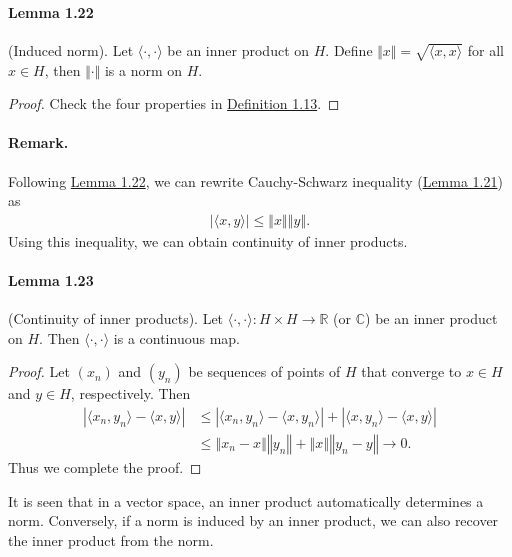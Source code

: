 \documentclass{article}
\begin{document}
\paragraph{Lemma 1.22\label{lemma:1.22}} (Induced norm). Let $\langle\cdot,\cdot\rangle$ be an inner product on $H$. Define $\Vert x\Vert=\sqrt{\langle x,x\rangle}$ for all $x\in H$, then $\Vert\cdot\Vert$ is a norm on $H$.
\begin{proof}
	Check the four properties in \hyperref[def:1.13]{Definition 1.13}.
\end{proof}

\paragraph{Remark.} Following \hyperref[lemma:1.22]{Lemma 1.22}, we can rewrite Cauchy-Schwarz inequality (\hyperref[lemma:1.21]{Lemma 1.21}) as
\begin{align*}
	\vert\langle x,y\rangle\vert \leq \Vert x\Vert\left\Vert y\right\Vert.
\end{align*}
Using this inequality, we can obtain continuity of inner products.

\paragraph{Lemma 1.23\label{lemma:1.23}} (Continuity of inner products). Let $\langle\cdot,\cdot\rangle:H\times H\to\mathbb{R}$ (or $\mathbb{C}$) be an inner product on $H$. Then $\langle\cdot,\cdot\rangle$ is a continuous map.

\begin{proof}
	Let $(x_n)$ and $(y_n)$ be sequences of points of $H$ that converge to $x\in H$ and $y\in H$, respectively. Then
	\begin{align*}
		\left\vert\langle x_n,y_n\rangle - \langle x,y\rangle\right\vert &\leq \left\vert\langle x_n,y_n\rangle - \langle x,y_n\rangle\right\vert + \left\vert\langle x,y_n\rangle - \langle x,y\rangle\right\vert\\
		&\leq \left\Vert x_n - x\right\Vert\left\Vert y_n\right\Vert + \left\Vert x\right\Vert\left\Vert y_n - y\right\Vert\to 0.
	\end{align*}
    Thus we complete the proof.
\end{proof}

It is seen that in a vector space, an inner product automatically determines a norm. Conversely, if a norm is induced by an inner product, we can also recover the inner product from the norm.
\end{document}
